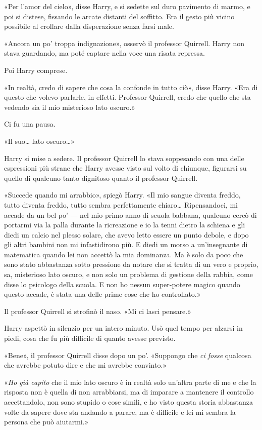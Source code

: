 «Per l’amor del cielo», disse Harry, e si sedette sul duro pavimento di marmo, e poi si distese, fissando le arcate distanti del soffitto. Era il gesto più vicino possibile al crollare dalla disperazione senza farsi male.

«Ancora un po’ troppa indignazione», osservò il professor Quirrell. Harry non stava guardando, ma poté captare nella voce una risata repressa.

Poi Harry comprese.

«In realtà, credo di sapere che cosa la confonde in tutto ciò», disse Harry. «Era di questo che volevo parlarle, in effetti. Professor Quirrell, credo che quello che sta vedendo sia il mio misterioso lato oscuro.»

Ci fu una pausa.

«Il suo… lato oscuro…»

Harry si mise a sedere. Il professor Quirrell lo stava soppesando con una delle espressioni più strane che Harry avesse visto sul volto di chiunque, figurarsi su quello di qualcuno tanto dignitoso quanto il professor Quirrell.

«Succede quando mi arrabbio», spiegò Harry. «Il mio sangue diventa freddo, tutto diventa freddo, tutto sembra perfettamente chiaro… Ripensandoci, mi accade da un bel po’ — nel mio primo anno di scuola babbana, qualcuno cercò di portarmi via la palla durante la ricreazione e io la tenni dietro la schiena e gli diedi un calcio nel plesso solare, che avevo letto essere un punto debole, e dopo gli altri bambini non mi infastidirono più. E diedi un morso a un’insegnante di matematica quando lei non accettò la mia dominanza. Ma è solo da poco che sono stato abbastanza sotto pressione da notare che si tratta di un vero e proprio, sa, misterioso lato oscuro, e non solo un problema di gestione della rabbia, come disse lo psicologo della scuola. E non ho nessun super-potere magico quando questo accade, è stata una delle prime cose che ho controllato.»

Il professor Quirrell si strofinò il naso. «Mi ci lasci pensare.»

Harry aspettò in silenzio per un intero minuto. Usò quel tempo per alzarsi in piedi, cosa che fu più difficile di quanto avesse previsto.

«Bene», il professor Quirrell disse dopo un po’. «Suppongo che \textit{ci fosse} qualcosa che avrebbe potuto dire e che mi avrebbe convinto.»

«\textit{Ho già capito} che il mio lato oscuro è in realtà solo un’altra parte di me e che la risposta non è quella di non arrabbiarsi, ma di imparare a mantenere il controllo accettandolo, non sono stupido o cose simili, e ho visto questa storia abbastanza volte da sapere dove sta andando a parare, ma è difficile e lei mi sembra la persona che può aiutarmi.»

